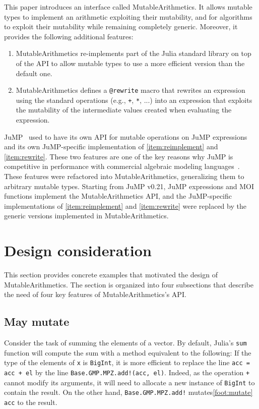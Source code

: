 \documentclass{juliacon}
\newcommand{\ma}{MutableArithmetics}
\begin{document}
This paper introduces an interface called \ma{}.
It allows mutable types to implement an arithmetic exploiting their mutability, and for algorithms to
exploit their mutability while remaining completely generic.
Moreover, it provides the following additional features:
\begin{enumerate}
  \item
    \label{item:reimplement}
    MutableArithmetics re-implements part of the Julia standard library on top of the API to allow mutable types to use a more efficient version than the default one.
  \item
    \label{item:rewrite}
    MutableArithmetics defines a \lstinline|@rewrite| macro that rewrites an expression using the standard operations (e.g., \lstinline|+|, \lstinline|*|, ...) into an expression that exploits the mutability of the intermediate values created when evaluating the expression.
\end{enumerate}

JuMP~\cite{dunning2017jump} used to have its own API for mutable operations on JuMP expressions and
its own JuMP-specific implementation of \eqref{item:reimplement} and \eqref{item:rewrite}.
These two features are one of the key reasons why JuMP is competitive in performance with commercial algebraic modeling languages~\cite[Section~3--4]{dunning2017jump}.
These features were refactored into \ma{}, generalizing them to arbitrary mutable types.
Starting from JuMP v0.21, JuMP expressions and MOI functions implement the \ma{} API, and
the JuMP-specific implementations of \eqref{item:reimplement} and \eqref{item:rewrite} were
replaced by the generic versions implemented in \ma{}.

\section{Design consideration}
This section provides concrete examples that motivated the design of \ma{}.
The section is organized into four subsections that describe the need of four key features of \ma{}'s API.

\subsection{May mutate}
\label{sec:may_mutate}
Consider the task of summing the elements of a vector.
By default, Julia's \lstinline|sum| function will compute the sum with a method equivalent to the following:
If the type of the elements of \lstinline|x| is \lstinline|BigInt|, it is more efficient to replace the line
\lstinline|acc = acc + el| by the line
\lstinline|Base.GMP.MPZ.add!(acc, el)|.
Indeed, as the operation \lstinline|+| cannot modify its arguments,
it will need to allocate a new instance of \lstinline|BigInt| to contain the result.
On the other hand, \lstinline|Base.GMP.MPZ.add!| mutates\cref{foot:mutate} \lstinline|acc| to the result.
\end{document}
